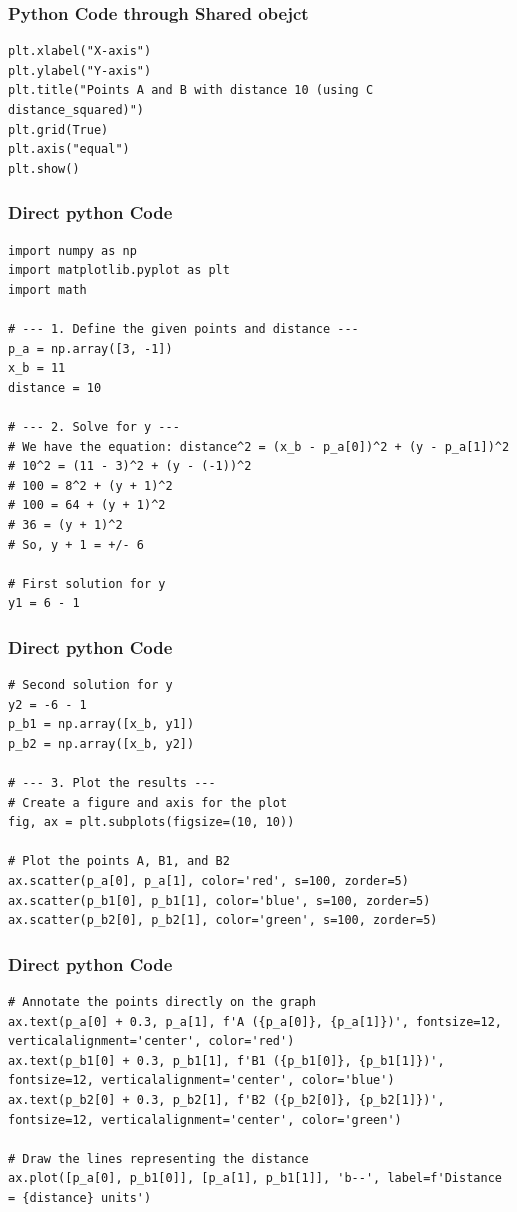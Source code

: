 \documentclass{beamer}
\begin{document}
\begin{frame}[fragile]
\frametitle{Python Code through Shared obejct}
\begin{lstlisting}
plt.xlabel("X-axis")
plt.ylabel("Y-axis")
plt.title("Points A and B with distance 10 (using C distance_squared)")
plt.grid(True)
plt.axis("equal")
plt.show()
\end{lstlisting}
\end{frame}
\begin{frame}[fragile]
\frametitle{Direct python Code}
\begin{lstlisting}
import numpy as np
import matplotlib.pyplot as plt
import math

# --- 1. Define the given points and distance ---
p_a = np.array([3, -1])
x_b = 11
distance = 10

# --- 2. Solve for y ---
# We have the equation: distance^2 = (x_b - p_a[0])^2 + (y - p_a[1])^2
# 10^2 = (11 - 3)^2 + (y - (-1))^2
# 100 = 8^2 + (y + 1)^2
# 100 = 64 + (y + 1)^2
# 36 = (y + 1)^2
# So, y + 1 = +/- 6

# First solution for y
y1 = 6 - 1
\end{lstlisting}
\end{frame}
\begin{frame}[fragile]
\frametitle{Direct python Code}
\begin{lstlisting}
# Second solution for y
y2 = -6 - 1
p_b1 = np.array([x_b, y1])
p_b2 = np.array([x_b, y2])

# --- 3. Plot the results ---
# Create a figure and axis for the plot
fig, ax = plt.subplots(figsize=(10, 10))

# Plot the points A, B1, and B2
ax.scatter(p_a[0], p_a[1], color='red', s=100, zorder=5)
ax.scatter(p_b1[0], p_b1[1], color='blue', s=100, zorder=5)
ax.scatter(p_b2[0], p_b2[1], color='green', s=100, zorder=5)
\end{lstlisting}
\end{frame}
\begin{frame}[fragile]
\frametitle{Direct python Code}
\begin{lstlisting}
# Annotate the points directly on the graph
ax.text(p_a[0] + 0.3, p_a[1], f'A ({p_a[0]}, {p_a[1]})', fontsize=12, verticalalignment='center', color='red')
ax.text(p_b1[0] + 0.3, p_b1[1], f'B1 ({p_b1[0]}, {p_b1[1]})', fontsize=12, verticalalignment='center', color='blue')
ax.text(p_b2[0] + 0.3, p_b2[1], f'B2 ({p_b2[0]}, {p_b2[1]})', fontsize=12, verticalalignment='center', color='green')

# Draw the lines representing the distance
ax.plot([p_a[0], p_b1[0]], [p_a[1], p_b1[1]], 'b--', label=f'Distance = {distance} units')
\end{lstlisting}
\end{frame}
\end{document}
